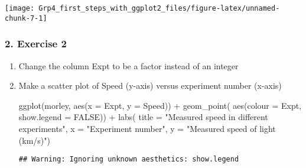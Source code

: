 \documentclass[
]{article}
\newenvironment{Shaded}{\begin{snugshade}}{\end{snugshade}}
\newcommand{\AttributeTok}[1]{\textcolor[rgb]{0.77,0.63,0.00}{#1}}
\newcommand{\CommentTok}[1]{\textcolor[rgb]{0.56,0.35,0.01}{\textit{#1}}}
\newcommand{\ConstantTok}[1]{\textcolor[rgb]{0.00,0.00,0.00}{#1}}
\newcommand{\FunctionTok}[1]{\textcolor[rgb]{0.00,0.00,0.00}{#1}}
\newcommand{\NormalTok}[1]{#1}
\newcommand{\OtherTok}[1]{\textcolor[rgb]{0.56,0.35,0.01}{#1}}
\newcommand{\SpecialCharTok}[1]{\textcolor[rgb]{0.00,0.00,0.00}{#1}}
\newcommand{\StringTok}[1]{\textcolor[rgb]{0.31,0.60,0.02}{#1}}
\begin{document}
\begin{enumerate}
  \begin{center}\texttt{[image: Grp4\_first\_steps\_with\_ggplot2\_files/figure-latex/unnamed-chunk-7-1]} \end{center}
\end{enumerate}

\hypertarget{exercise-2}{%
\subsubsection{2. Exercise 2}\label{exercise-2}}

\begin{enumerate}
\def\labelenumi{(\alph{enumi})}
\item
  Change the column Expt to be a factor instead of an integer

\begin{Shaded}
\end{Shaded}
\item
  Make a scatter plot of Speed (y-axis) versus experiment number
  (x-axis)

\begin{Shaded}
\begin{Highlighting}[]
  \FunctionTok{ggplot}\NormalTok{(morley, }\FunctionTok{aes}\NormalTok{(}\AttributeTok{x =}\NormalTok{ Expt, }\AttributeTok{y =}\NormalTok{ Speed)) }\SpecialCharTok{+} 
  \FunctionTok{geom\_point}\NormalTok{(}
    \FunctionTok{aes}\NormalTok{(}\AttributeTok{colour =}\NormalTok{ Expt, }
        \AttributeTok{show.legend =} \ConstantTok{FALSE}\NormalTok{)) }\SpecialCharTok{+}
  \FunctionTok{labs}\NormalTok{(}
    \AttributeTok{title =} \StringTok{"Measured speed in different experiments"}\NormalTok{,}
    \AttributeTok{x =} \StringTok{"Experiment number"}\NormalTok{,}
    \AttributeTok{y =} \StringTok{"Measured speed of light (km/s)"}\NormalTok{)}
\end{Highlighting}
\end{Shaded}

\begin{verbatim}
## Warning: Ignoring unknown aesthetics: show.legend
\end{verbatim}


\end{enumerate}
\end{document}
